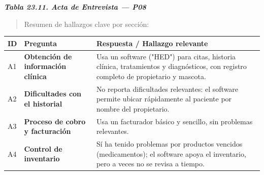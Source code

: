 \documentclass[
]{article}
\newcounter{none} %
\begin{document}
\protect{}\label{_bookmark_P08_acta}{}\emph{\textbf{Tabla 23.11. Acta de Entrevista --- P08}}

\begin{quote}
Resumen de hallazgos clave por sección:
\end{quote}

{\def\LTcaptype{none} %
\begin{longtable}[]{|
  >{\centering\arraybackslash}p{}|
  >{\raggedright\arraybackslash}p{}|
  >{\raggedright\arraybackslash}p{}|}
\hline
\begin{minipage}[b]{\linewidth}\centering
\textbf{ID}
\end{minipage} & \begin{minipage}[b]{\linewidth}\centering
\textbf{Pregunta}
\end{minipage} & \begin{minipage}[b]{\linewidth}\raggedright
\textbf{Respuesta / Hallazgo relevante}
\end{minipage} \\
\hline
\endhead
\hline
\endlastfoot
A1 & \textbf{Obtención de información clínica} &
\begin{minipage}[t]{\linewidth}\raggedright
Usa un software ("HED") para citas, historia clínica, tratamientos y diagnósticos, con registro completo de propietario y mascota.
\end{minipage} \\
\hline
A2 & \textbf{Dificultades con el historial} &
\begin{minipage}[t]{\linewidth}\raggedright
No reporta dificultades relevantes: el software permite ubicar rápidamente al paciente por nombre del propietario.
\end{minipage} \\
\hline
A3 & \textbf{Proceso de cobro y facturación} &
\begin{minipage}[t]{\linewidth}\raggedright
Usa un facturador básico y sencillo, sin problemas relevantes.
\end{minipage} \\
\hline
A4 & \textbf{Control de inventario} &
\begin{minipage}[t]{\linewidth}\raggedright
Sí ha tenido problemas por productos vencidos (medicamentos); el software apoya el inventario, pero a veces no se revisa a tiempo.
\end{minipage} \\

\end{longtable}}
\end{document}
